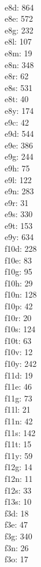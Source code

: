 \begin{multicols}{8}
  \\ e8d: 864
  \\ e8e: 572
  \\ e8g: 232
  \\ e8l: 107
  \\ e8m: 19
  \\ e8n: 348
  \\ e8r: 62
  \\ e8s: 531
  \\ e8t: 40
  \\ e8y: 174
  \\ e9c: 42
  \\ e9d: 544
  \\ e9e: 386
  \\ e9g: 244
  \\ e9h: 75
  \\ e9l: 122
  \\ e9n: 283
  \\ e9r: 31
  \\ e9s: 330
  \\ e9t: 153
  \\ e9y: 634
  \\ f10d: 228
  \\ f10e: 83
  \\ f10g: 95
  \\ f10h: 29
  \\ f10n: 128
  \\ f10p: 42
  \\ f10r: 20
  \\ f10s: 124
  \\ f10t: 63
  \\ f10v: 12
  \\ f10y: 242
  \\ f11d: 19
  \\ f11e: 46
  \\ f11g: 73
  \\ f11l: 21
  \\ f11n: 42
  \\ f11s: 142
  \\ f11t: 15
  \\ f11y: 59
  \\ f12g: 14
  \\ f12n: 11
  \\ f12s: 33
  \\ f13s: 10
  \\ f3d: 18
  \\ f3e: 47
  \\ f3g: 340
  \\ f3n: 26
  \\ f3o: 17

\end{multicols}
